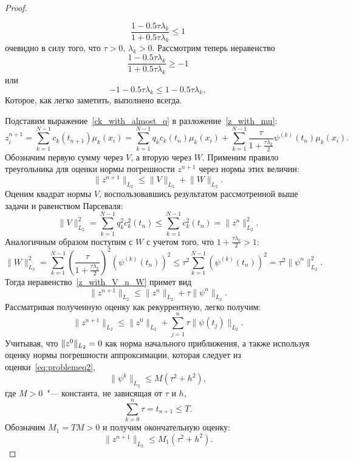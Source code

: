 \documentclass[11pt,a4paper,twoside,listtotoc,bibtotoc]{report}
\numberwithin{equation}{section}
\theoremstyle{definition}
\theoremstyle{plain}
\DeclarePairedDelimiter\norm{\lVert}{\rVert}
\begin{document}
\begin{proof}
\begin{solution}
    $$
        \dfrac{1-0.5\tau\lambda_k}{1+0.5\tau\lambda_k} \leqslant 1
    $$
    очевидно в силу того, что $\tau > 0$, $\lambda_k > 0$. Рассмотрим теперь неравенство
    $$
        \dfrac{1-0.5\tau\lambda_k}{1+0.5\tau\lambda_k} \geqslant -1
    $$
    или
    $$
        -1-0.5\tau\lambda_k \leqslant 1-0.5\tau\lambda_k,
    $$
    Которое, как легко заметить, выполнено всегда.
\end{solution}
%
Подставим выражение~\eqref{ck_with_almost_q} в разложение~\eqref{z_with_mu}:
%
$$
    z_i^{n+1} = \sum_{k=1}^{N-1} c_k(t_{n+1})\mu_k(x_i) =
    \sum_{k=1}^{N-1} q_kc_k(t_n)\mu_k(x_i) + \sum_{k=1}^{N-1}
    \frac{\tau}{1+\frac{\tau\lambda_k}{2}} \psi^{(k)}(t_n)\mu_k(x_i).
$$
%
Обозначим первую сумму через $V$, а вторую через $W$. Применим правило треугольника
для оценки нормы погрешности $z^{n+1}$ через нормы этих величин:
%
\begin{equation}
%
    \label{z_with_V_n_W}
    \big\|z^{n+1}\big\|_{L_2} \leqslant \big\|V\big\|_{L_2} + \big\|W\big\|_{L_2}.
%
\end{equation}
%
Оценим квадрат нормы $V$, воспользовавшись результатом рассмотренной выше
задачи и равенством Парсеваля:
%
$$
    \big\|V\big\|_{L_2}^2 = \sum_{k=1}^{N-1} q_k^2 c_k^2(t_n) \leqslant
    \sum_{k=1}^{N-1} c_k^2(t_n) = \big\|z^n\big\|_{L_2}^2.
$$
%
Аналогичным образом поступим с $W$ с учетом того, что $1+\frac{\tau\lambda_k}{2} > 1$:
$$
    \big\|W\big\|_{L_2}^2 = \sum_{k=1}^{N-1} \left(\dfrac{\tau}{1+\frac{\tau\lambda_k}{2}}\right)^2
    \left(\psi^{(k)}(t_n)\right)^2 \leqslant \tau^2\sum_{k=1}^{N-1}
    \left(\psi^{(k)}(t_n)\right)^2 = \tau^2 \big\|\psi^n\big\|_{L_2}^2.
$$
%
Тогда неравенство~\eqref{z_with_V_n_W} примет вид
%
$$
    \big\|z^{n+1}\big\|_{L_2} \leqslant \big\|z^n\big\|_{L_2}
    + \tau \big\|\psi^n\big\|_{L_2}.
$$
%
Рассматривая полученную оценку как рекуррентную, легко получим:
%
\begin{equation}
    \label{z_estim}
    \big\|z^{n+1}\big\|_{L_2} \leqslant \big\|z^0\big\|_{L_2} +
    \sum_{j=1}^{n} \tau\big\|\psi(t_j)\big\|_{L_2}.
\end{equation}
%
Учитывая, что $\norm{z^0}_{L_2} = 0$ как норма начального приближения, а также
используя оценку нормы погрешности аппроксимации, которая следует из
оценки~\eqref{eq:problemeq2},
%
$$
    \big\|\psi^k\big\|_{L_2} \leqslant M\left(\tau^2 + h^2\right),
$$
%
где $M > 0$~"--- константа, не зависящая от $\tau$ и $h$,
%
$$
    \sum_{k = 0}^n\tau = t_{n+1} \leqslant T.
$$
%
Обозначим $M_1=TM > 0$ и получим окончательную оценку:
%
$$
    \big\|z^{n+1}\big\|_{L_2} \leqslant M_1\left(\tau^2 + h^2\right).
$$
%
%
\end{proof}
\end{document}
